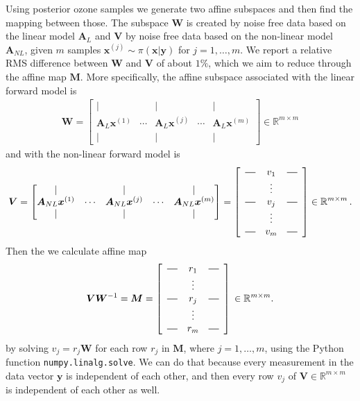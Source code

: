Using posterior ozone samples we generate two affine subspaces and then find the mapping between those.
The subspace $\bm{W}$ is created by noise free data based on the linear model $\bm{A}_L$ and $\bm{V}$ by noise free data based on the non-linear model $\bm{A}_{NL}$, given $m$ samples $\bm{x}^{(j)} \sim \pi(\bm{x}|\bm{y})$ for $j = 1, \dots,m$.
We report a relative RMS difference between $\bm{W}$ and $\bm{V}$ of about $1\%$, which we aim to reduce through the affine map $\bm{M}$.
More specifically, the affine subspace associated with the linear forward model is 
\begin{align}
	\bm{W} = \begin{bmatrix}
		\vert&   &  \vert & & \vert \\
		\bm{A}_{L} \bm{x}^{(1)} &  \cdots& \bm{A}_{L} \bm{x}^{(j)} &  \cdots & \bm{A}_{L} \bm{x}^{(m)} \\
		\vert&   &  \vert & & \vert 
	\end{bmatrix}
	\in \mathbb{R}^{m \times m}
\end{align} and with the non-linear forward model is 
\begin{align}
	\bm{V} = \begin{bmatrix}
		\vert&   &  \vert & & \vert \\
		\bm{A}_{NL}\bm{x}^{(1)} &  \cdots& \bm{A}_{NL}\bm{x}^{(j)} &  \cdots & \bm{A}_{NL} \bm{x}^{(m)}  \\
		\vert&   &  \vert & & \vert 
	\end{bmatrix} = 
	\begin{bmatrix}
		\begin{array}{ccc}
			\horzbar & v_{1} & \horzbar \\
			& \vdots    &          \\
			\horzbar & v_{j} & \horzbar \\
			& \vdots    &          \\
			\horzbar &v_{m} & \horzbar
		\end{array}
	\end{bmatrix}\in \mathbb{R}^{m \times m} \, .
\end{align}
Then the we calculate affine map 
\begin{align}
	\bm{V}\bm{W}^{-1} = \bm{M} =
	\begin{bmatrix}
		\begin{array}{ccc}
			\horzbar & r_{1} & \horzbar \\
			& \vdots    &          \\
			\horzbar & r_{j} & \horzbar \\
			& \vdots    &          \\
			\horzbar &r_{m} & \horzbar
		\end{array}
	\end{bmatrix}\, \in \mathbb{R}^{m \times m} .
\end{align}
by solving $v_j =r_j \bm{W}$ for each row $r_j$ in $\bm{M}$, where $j = 1, \dots, m$, using the Python function \texttt{numpy.linalg.solve}.
We can do that because every measurement in the data vector $\bm{y}$ is independent of each other, and then every row $v_j$ of $\bm{V} \in \mathbb{R}^{m \times m}$ is independent of each other as well.

